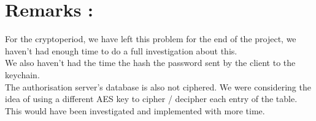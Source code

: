 \section{Remarks :}

For the cryptoperiod, we have left this problem for the end of the project, we haven't had enough time to do a full investigation about this.\\

We also haven't had the time the hash the password sent by the client to the keychain.\\

The authorisation server's database is also not ciphered. We were considering the idea of using a different AES key to cipher / decipher each entry of the table. This would have been investigated and implemented with more time.


